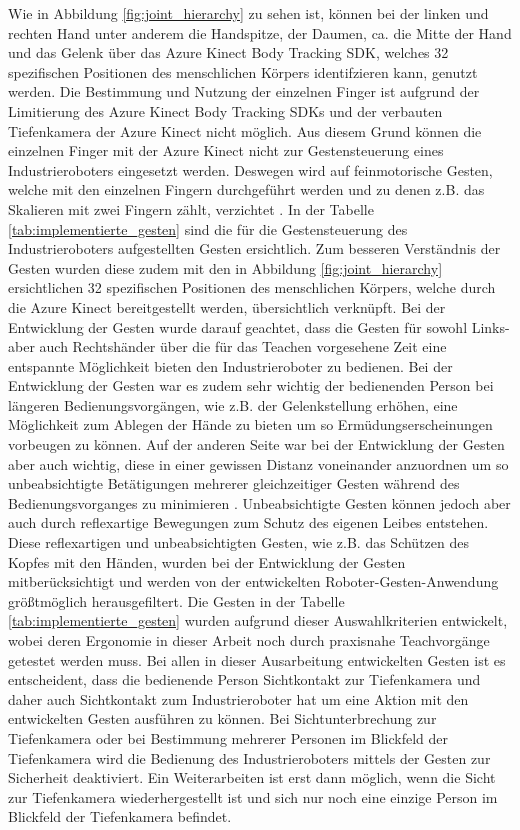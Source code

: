 Wie in Abbildung \ref{fig:joint_hierarchy} zu sehen ist, können bei der linken und rechten Hand unter anderem die Handspitze, der Daumen, ca. die Mitte der Hand und das Gelenk über das Azure Kinect Body Tracking SDK, welches 32 spezifischen Positionen des menschlichen Körpers identifzieren kann, genutzt werden. Die Bestimmung und Nutzung der einzelnen Finger ist aufgrund der Limitierung des Azure Kinect Body Tracking SDKs und der verbauten Tiefenkamera der Azure Kinect nicht möglich. Aus diesem Grund können die einzelnen Finger mit der Azure Kinect nicht zur Gestensteuerung eines Industrieroboters eingesetzt werden. Deswegen wird auf feinmotorische Gesten, welche mit den einzelnen Fingern durchgeführt werden und zu denen z.B. das Skalieren mit zwei Fingern zählt, verzichtet \cite{qm13_azure_joints_nodate}. In der Tabelle \ref{tab:implementierte_gesten} sind die für die Gestensteuerung des Industrieroboters aufgestellten Gesten ersichtlich. Zum besseren Verständnis der Gesten wurden diese zudem mit den in Abbildung \ref{fig:joint_hierarchy} ersichtlichen 32 spezifischen Positionen des menschlichen Körpers, welche durch die Azure Kinect bereitgestellt werden, übersichtlich verknüpft. Bei der Entwicklung der Gesten wurde darauf geachtet, dass die Gesten für sowohl Links- aber auch Rechtshänder über die für das Teachen vorgesehene Zeit eine entspannte Möglichkeit bieten den Industrieroboter zu bedienen. Bei der Entwicklung der Gesten war es zudem sehr wichtig der bedienenden Person bei längeren Bedienungsvorgängen, wie z.B. der Gelenkstellung erhöhen, eine Möglichkeit zum Ablegen der Hände zu bieten um so Ermüdungserscheinungen vorbeugen zu können. Auf der anderen Seite war bei der Entwicklung der Gesten aber auch wichtig, diese in einer gewissen Distanz voneinander anzuordnen um so unbeabsichtigte Betätigungen mehrerer gleichzeitiger Gesten während des Bedienungsvorganges zu minimieren \cite{proff_radikale_2013}. Unbeabsichtigte Gesten können jedoch aber auch durch reflexartige Bewegungen zum Schutz des eigenen Leibes entstehen. Diese reflexartigen und unbeabsichtigten Gesten, wie z.B. das Schützen des Kopfes mit den Händen, \cite[95]{matschnig_korpersprache_2007} wurden bei der Entwicklung der Gesten mitberücksichtigt und werden von der entwickelten Roboter-Gesten-Anwendung größtmöglich herausgefiltert. Die Gesten in der Tabelle \ref{tab:implementierte_gesten} wurden aufgrund dieser Auswahlkriterien entwickelt, wobei deren Ergonomie in dieser Arbeit noch durch praxisnahe Teachvorgänge getestet werden muss. Bei allen in dieser Ausarbeitung entwickelten Gesten ist es entscheident, dass die bedienende Person Sichtkontakt zur Tiefenkamera und daher auch Sichtkontakt zum Industrieroboter hat um eine Aktion mit den entwickelten Gesten ausführen zu können. Bei Sichtunterbrechung zur Tiefenkamera oder bei Bestimmung mehrerer Personen im Blickfeld der Tiefenkamera wird die Bedienung des Industrieroboters mittels der Gesten zur Sicherheit deaktiviert. Ein Weiterarbeiten ist erst dann möglich, wenn die Sicht zur Tiefenkamera wiederhergestellt ist und sich nur noch eine einzige Person im Blickfeld der Tiefenkamera befindet.\newline

